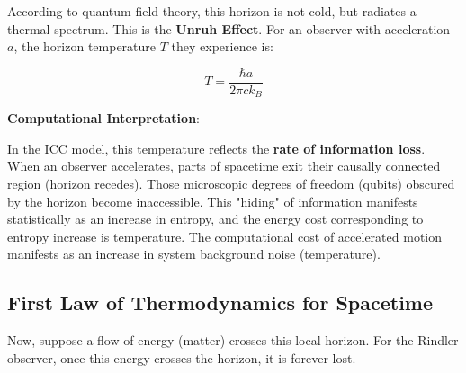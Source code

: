 According to quantum field theory, this horizon is not cold, but radiates a thermal spectrum. This is the \textbf{Unruh Effect}. For an observer with acceleration $a$, the horizon temperature $T$ they experience is:

\begin{equation}
T = \frac{\hbar a}{2\pi c k_B}
\end{equation}

\textbf{Computational Interpretation}:

In the ICC model, this temperature reflects the \textbf{rate of information loss}. When an observer accelerates, parts of spacetime exit their causally connected region (horizon recedes). Those microscopic degrees of freedom (qubits) obscured by the horizon become inaccessible. This "hiding" of information manifests statistically as an increase in entropy, and the energy cost corresponding to entropy increase is temperature. The computational cost of accelerated motion manifests as an increase in system background noise (temperature).

\subsection{First Law of Thermodynamics for Spacetime}

Now, suppose a flow of energy (matter) crosses this local horizon. For the Rindler observer, once this energy crosses the horizon, it is forever lost.

